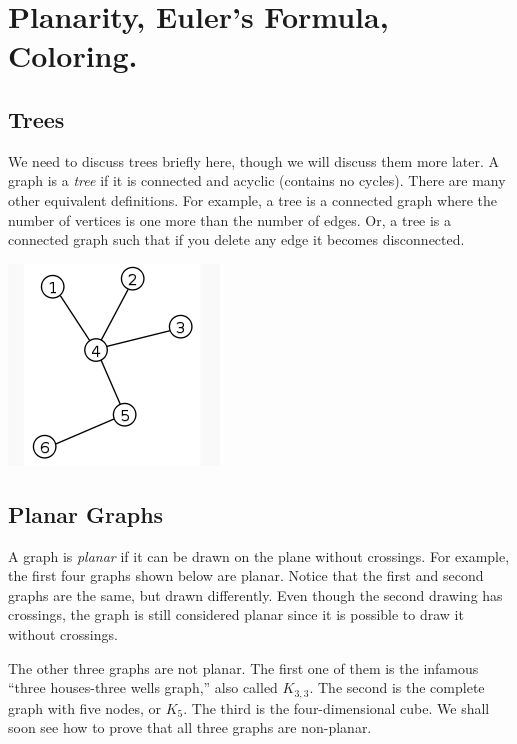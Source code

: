 \documentclass[11pt]{article}
\newcounter{thm}
\begin{document}

\section{Planarity, Euler's Formula, Coloring.}

\subsection*{Trees}

We need to discuss trees briefly here, though we will discuss them
more later.  A graph is a {\em tree} if it is connected and acyclic
(contains no cycles).  There are many other equivalent definitions.
For example, a tree is a connected graph where the number of vertices
is one more than the number of edges.  Or, a tree is a connected graph
such that if you delete any edge it becomes disconnected.

\includegraphics[scale=.7]{figures/tree}

\subsection*{Planar Graphs}

A graph is {\em planar} if it can be drawn on the plane without
crossings.  For example, the first four graphs shown below are
planar.  Notice that the first and second graphs are the same, but drawn
differently.  Even though the second drawing has crossings, the graph is
still considered planar since it is possible to draw it without crossings.

The other three graphs are not planar.
The first one of them is the
infamous ``three houses-three wells graph,'' also called $K_{3,3}$.
The second is the complete graph with five nodes, or $K_5$.   The
third is the four-dimensional cube.  We shall soon see how to prove
that all three graphs are non-planar.
\end{document}

